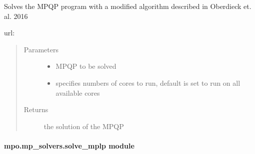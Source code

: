 \documentclass[letterpaper,10pt,english]{sphinxmanual}
\begin{document}
\begin{fulllineitems}
\label{\detokenize{mpo.mp_solvers:mpo.mp_solvers.mpqp_parrallel_graph.solve}}
\sphinxAtStartPar
Solves the MPQP program with a modified algorithm described in Oberdieck et. al. 2016

\sphinxAtStartPar
url: 
\begin{quote}\begin{description}
\item[{Parameters}] \leavevmode\begin{itemize}
\item {} 
\sphinxAtStartPar
{} \textendash{} MPQP to be solved

\item {} 
\sphinxAtStartPar
{} \textendash{} specifies numbers of cores to run, default is set to run on all available cores

\end{itemize}

\item[{Returns}] \leavevmode
\sphinxAtStartPar
the solution of the MPQP

\end{description}\end{quote}

\end{fulllineitems}



\paragraph{mpo.mp\_solvers.solve\_mplp module}
\label{\detokenize{mpo.mp_solvers:module-mpo.mp_solvers.solve_mplp}}\label{\detokenize{mpo.mp_solvers:mpo-mp-solvers-solve-mplp-module}}
\end{document}
